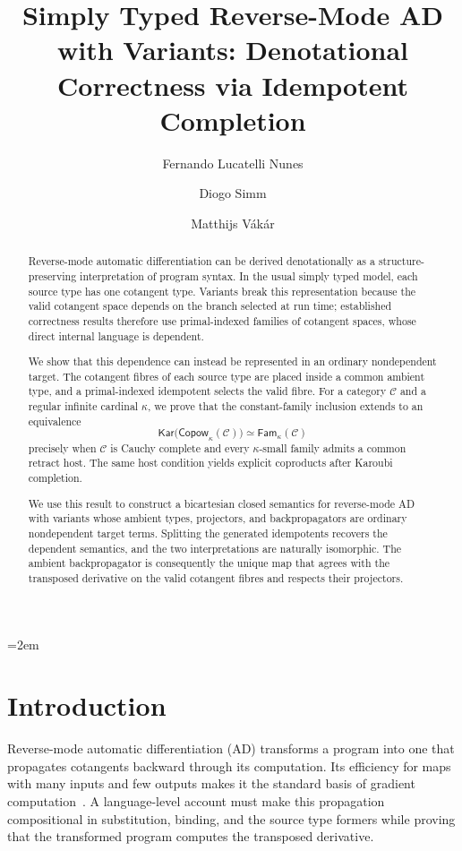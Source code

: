 \documentclass[runningheads,envcountsame]{llncs}
\title{Simply Typed Reverse-Mode AD with Variants: Denotational Correctness via Idempotent Completion}
\author{Fernando Lucatelli Nunes\inst{1} \and Diogo Simm\inst{2} \and Matthijs V\'ak\'ar\inst{2}}
\institute{Centre for Mathematics, University of Coimbra, Portugal\\
\email{fln@uc.pt}
\and
Department of Information and Computing Sciences, Utrecht University, The Netherlands\\
\email{\{d.l.simmsallesvianna,m.i.l.vakar\}@uu.nl}}
\newcommand{\Copow}{\mathsf{Copow}}
\newcommand{\Fam}{\mathsf{Fam}}
\newcommand{\Kar}{\mathsf{Kar}}
\begin{document}
\emergencystretch=2em
\maketitle




\begin{abstract}
Reverse-mode automatic differentiation can be derived denotationally as a
structure-preserving interpretation of program syntax. In the usual simply
typed model, each source type has one cotangent type. Variants break this
representation because the valid cotangent space depends on the branch selected
at run time; established correctness results therefore use primal-indexed
families of cotangent spaces, whose direct internal language is dependent.

We show that this dependence can instead be represented in an ordinary
nondependent target. The cotangent fibres of each source type are placed inside
a common ambient type, and a primal-indexed idempotent selects the valid fibre.
For a category $\mathcal C$ and a regular infinite cardinal $\kappa$, we prove
that the constant-family inclusion extends to an equivalence
$$
\Kar\bigl(\Copow_\kappa(\mathcal C)\bigr)
\simeq
\Fam_\kappa(\mathcal C)
$$
precisely when $\mathcal C$ is Cauchy complete and every $\kappa$-small family
admits a common retract host. The same host condition yields explicit
coproducts after Karoubi completion.

We use this result to construct a bicartesian closed semantics for reverse-mode
AD with variants whose ambient types, projectors, and backpropagators are
ordinary nondependent target terms. Splitting the generated idempotents recovers
the dependent semantics, and the two interpretations are naturally isomorphic.
The ambient backpropagator is consequently the unique map that agrees with the
transposed derivative on the valid cotangent fibres and respects their
projectors.
\end{abstract}


\section{Introduction}
\label{sec:intro}

Reverse-mode automatic differentiation (AD) transforms a program into one that
propagates cotangents backward through its computation. Its efficiency for maps
with many inputs and few outputs makes it the standard basis of gradient
computation~\cite{GriewankWalther2008,BaydinEtAl2018,Margossian2019}. A
language-level account must make this propagation compositional in substitution,
binding, and the source type formers while proving that the transformed program
computes the transposed derivative.
\end{document}
